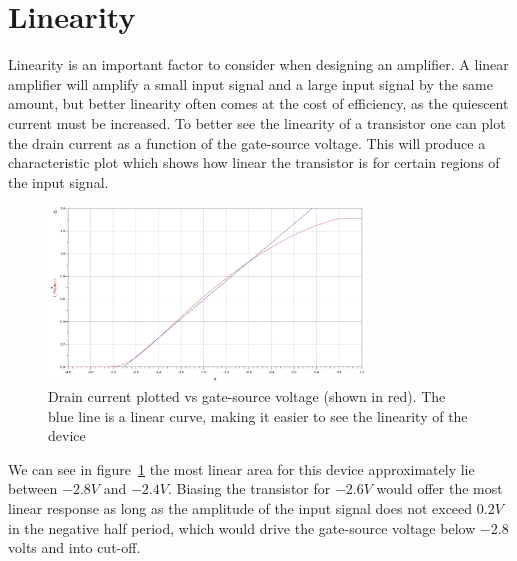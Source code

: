 \section{Linearity}
Linearity is an important factor to consider when designing an amplifier. A linear amplifier will amplify a small input signal and a large input signal by the same amount, but better linearity often comes at the cost of efficiency, as the quiescent current must be increased. To better see the linearity of a transistor one can plot the drain current as a function of the gate-source voltage. This will produce a characteristic plot which shows how linear the transistor is for certain regions of the input signal.
\begin{figure}[H]
	  \centering
	  \includegraphics[width=0.75\textwidth]{img/Linearity_curve}
	  \caption{Drain current plotted vs gate-source voltage (shown in red). The blue line is a linear curve, making it easier to see the linearity of the device}
	  \label{fig:fig_Linearity_line}
\end{figure}
We can see in figure~\ref{fig:fig_Linearity_line} the most linear area for this device approximately lie between $-2.8V$ and $-2.4V$. Biasing the transistor for $-2.6V$ would offer the most linear response as long as the amplitude of the input signal does not exceed $0.2V$ in the negative half period, which would drive the gate-source voltage below $-2.8$ volts and into cut-off. 
